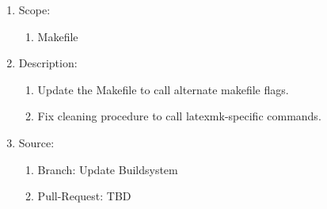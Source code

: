 
\begin{enumerate}
	\item Scope:
		\begin{enumerate}
			\item Makefile
		\end{enumerate}

	\item Description:
		\begin{enumerate}
			\item Update the Makefile to call alternate makefile flags.

			\item Fix cleaning procedure to call latexmk-specific commands.
		\end{enumerate}

	\item Source:
		\begin{enumerate}
			\item Branch: Update Buildsystem

			\item Pull-Request: TBD
		\end{enumerate}
\end{enumerate}